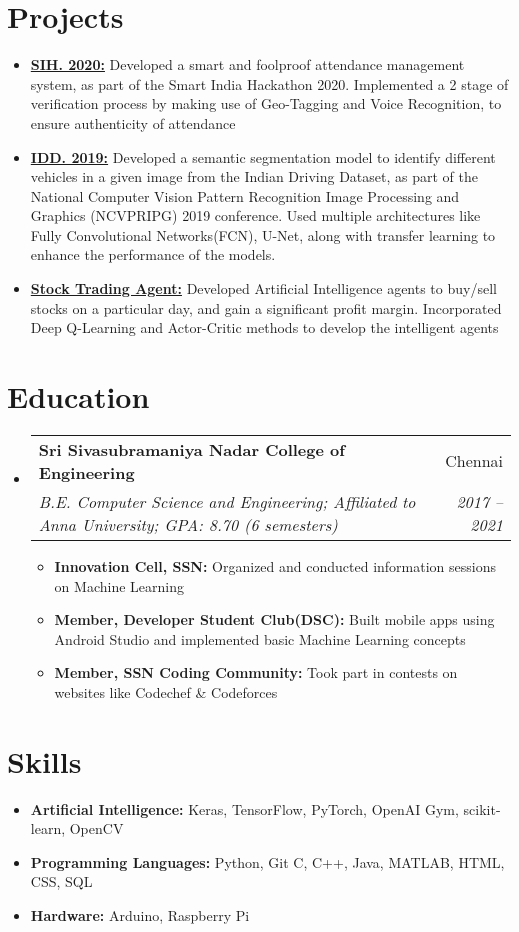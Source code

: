 \documentclass[letterpaper,11pt]{article}
\makeatletter
\newcommand{\resumeItem}[2]{
\item\small{
\textbf{#1}{ #2 \vspace{-2pt} }
}
}
\newcommand{\resumeSubheading}[4]{
\vspace{-1pt}\item
\begin{tabular*}{0.97\textwidth}{l@{\extracolsep{\fill}}r}
\textbf{#1} & #2 \\
\textit{\small#3} & \textit{\small #4} \\
\end{tabular*}\vspace{-5pt}
}
\newcommand{\resumeSubHeadingListStart}{\begin{itemize}[leftmargin=*]}
\newcommand{\resumeSubHeadingListEnd}{\end{itemize}}
\newcommand{\resumeItemListStart}{\begin{itemize}}
\newcommand{\resumeItemListEnd}{\end{itemize}\vspace{-5pt}}
\makeatother
\begin{document}
\section{Projects}
\resumeSubHeadingListStart
\resumeItem{\href{https://github.com/RamKaushikR/SIH-2020}{\textsc{\icon{\faExternalLink}} SIH. 2020:}}{Developed a smart and foolproof attendance management system, as part of the Smart India Hackathon 2020. Implemented a  2 stage of verification process by making use of Geo-Tagging and Voice Recognition, to ensure authenticity of attendance}
\resumeItem{\href{https://github.com/RamKaushikR/IDD}{\textsc{\icon{\faExternalLink}} IDD. 2019:}}{Developed a semantic segmentation model to identify different vehicles in a given image from the Indian Driving Dataset, as part of the National Computer Vision Pattern Recognition Image Processing and Graphics (NCVPRIPG) 2019 conference. Used multiple architectures like Fully Convolutional Networks(FCN), U-Net, along with transfer learning to enhance the performance of the models.}
\resumeItem{\href{https://github.com/RamKaushikR/StockTrading}{\textsc{\icon{\faExternalLink}}Stock Trading Agent:}}{Developed Artificial Intelligence agents to buy/sell stocks on a particular day, and gain a significant profit margin. Incorporated Deep Q-Learning and Actor-Critic methods to develop the intelligent agents}
\resumeSubHeadingListEnd

\section{Education}
\resumeSubHeadingListStart
\resumeSubheading
{Sri Sivasubramaniya Nadar College of Engineering}{Chennai}
{B.E. Computer Science and Engineering; Affiliated to Anna University; GPA: 8.70 (6 semesters)}{2017 -- 2021}
\resumeItemListStart
\resumeItem{Innovation Cell, SSN:}{Organized and conducted information sessions on Machine Learning}
\resumeItem{Member, Developer Student Club(DSC):}{Built mobile apps using Android Studio and implemented basic Machine Learning concepts}
\resumeItem{Member, SSN Coding Community:}{Took part in contests on websites like Codechef \& Codeforces}
\resumeItemListEnd
\resumeSubHeadingListEnd

\section{Skills}
\resumeSubHeadingListStart
\resumeItem{Artificial Intelligence:}{Keras, TensorFlow, PyTorch, OpenAI Gym, scikit-learn, OpenCV}
\resumeItem{Programming Languages:}{Python, Git C, C++, Java, MATLAB, HTML, CSS, SQL}
\resumeItem{Hardware:}{Arduino, Raspberry Pi}
\resumeSubHeadingListEnd
\end{document}
